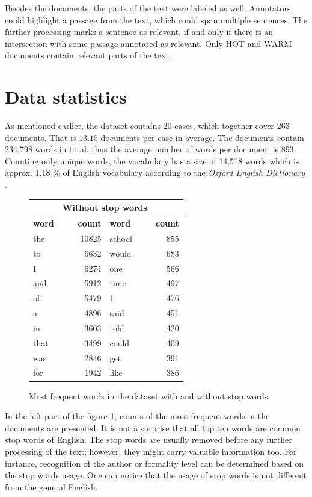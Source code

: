 \documentclass[
  digital, %
  notable,   %
  nolof,     %
  nolot,     %
  draft
]{fithesis3}
\begin{document}
Besides the documents, the parts of the text were labeled as well.
Annotators could highlight a passage from the text, which could span multiple sentences.
The further processing marks a sentence as relevant, if and only if there is an intersection with some passage annotated as relevant.
Only HOT and WARM documents contain relevant parts of the text.

\section{Data statistics}
As mentioned earlier, the dataset contains 20 cases, which together cover 263 documents. That is $13.15$ documents per case in average.
The documents contain 234,798 words in total, thus the average number of words per document is 893.
Counting only unique words, the vocabulary has a size of 14,518 words which is approx. 1.18 \% of English vocabulary according to the \textit{Oxford English Dictionary}  \cite{oxfordDictionaries}.

\begin{figure}[h]
\centering
\caption{Most frequent words in the dataset with and without stop words.}
\label{fig:most_frequent}
\footnotesize
\begin{tabular}{|l|r||l|r|}\hline
\rowcolor{orange!50}
\multicolumn{2}{|c||}{\makebox[9em]{\textbf{All words}}} & \multicolumn{2}{|c|}{\textbf{Without stop words}} \\\hline\hline
\textbf{word} & \textbf{count} & \textbf{word} & \textbf{count} \\\hline\hline
the & 10825 & school & 855 \\\hline
to & 6632 & would & 683 \\\hline
I & 6274 & one & 566 \\\hline
and & 5912 & time & 497 \\\hline
of & 5479 & 1 & 476 \\\hline
a & 4896 & said & 451 \\\hline
in & 3603 & told & 420 \\\hline
that & 3499 & could & 409 \\\hline
was & 2846 & get & 391 \\\hline
for & 1942 & like & 386 \\\hline
\end{tabular}
\normalsize
\end{figure}

In the left part of the figure \ref{fig:most_frequent}, counts of the most frequent words in the documents are presented.
It is not a surprise that all top ten words are common stop words of English.
The stop words are usually removed before any further processing of the text; however, they might carry valuable information too.
For instance, recognition of the author or formality level can be determined based on the stop words usage.
One can notice that the usage of stop words is not different from the general English.
\end{document}
